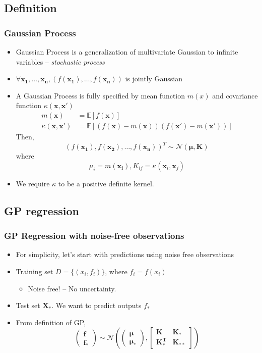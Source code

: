 \documentclass{beamer}
\begin{document}
\subsection{Definition}
\begin{frame}
	\frametitle{Gaussian Process}
	\begin{itemize}
		\item Gaussian Process is a generalization of multivariate Gaussian to infinite variables -- {\em stochastic process}
		\item $\forall \mathbf{x_1}, \ldots, \mathbf{x_n}, (f(\mathbf{x_1}), \ldots, f(\mathbf{x_n}))$ is jointly Gaussian
		\item A Gaussian Process is fully specified by mean function $m(x)$ and covariance function $\kappa(\mathbf{x}, \mathbf{x'})$
		\begin{align*}
				m(\mathbf{x}) &= \mathbb{E}[f(\mathbf{x})] \\
				\kappa(\mathbf{\mathbf{x}}, \mathbf{\mathbf{x'}}) &= \mathbb{E}[(f(\mathbf{x})-m(\mathbf{x}))(f(\mathbf{x'})-m(\mathbf{x'}))]				
		\end{align*}	
		Then, 
		\[
			 (f(\mathbf{x_1}), f(\mathbf{x_2}), \ldots, f(\mathbf{x_n}))^T \sim \mathcal{N}(\bm{\mu}, \bm{K})			 
		\]
		where
		\[
			\mu_i = m(\mathbf{x_i}), K_{ij} = \kappa(\mathbf{x}_i, \mathbf{x}_j)
		\]
		\item We require $\kappa$ to be a positive definite kernel.
	\end{itemize}
\end{frame}

\subsection{GP regression}
\begin{frame}
	\frametitle{GP Regression with noise-free observations}
	\begin{itemize}
			\item For simplicity, let's start with predictions using noise free observations
			\item Training set $D=\{(x_i, f_i)\}$, where $f_i=f(x_i)$
				\begin{itemize}
					\item Noise free! -- No uncertainty.
				\end{itemize}
			\item Test set $\mathbf{X_*}$. We want to predict outputs $f_*$
			\item From definition of GP,
		\[\left( {\begin{array}{*{20}{c}}
			\bm{f}\\
			{\bm{f_*}}
			\end{array}} \right)\sim \mathcal{N}\left( {\left( {\begin{array}{*{20}{c}}
			\bm{\mu} \\
			{\bm{\mu _*}}
			\end{array}} \right),\left[ {\begin{array}{*{20}{c}}
			\bm{K}&{\bm{K_*}}\\
			\bm{K_*^T}&{\bm{K_{**}}}
			\end{array}} \right]} \right)\]
	\end{itemize}
\end{frame}
\end{document}
